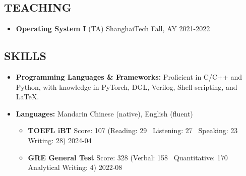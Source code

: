 \documentclass[a4paper,10pt]{ctexart} %
\begin{document}
\begin{keepsection}
\subsection{TEACHING}

    \begin{itemize}
        \item \textbf{Operating System I} (TA) \hfill ShanghaiTech \quad Fall, AY 2021-2022
    \end{itemize}
\end{keepsection}



\begin{keepsection}

\section{SKILLS}
\begin{itemize}
    \item \textbf{Programming Languages \& Frameworks:} Proficient in C/C++ and Python, with knowledge in PyTorch, DGL, Verilog, Shell scripting, and \LaTeX.
    \item \textbf{Languages:} Mandarin Chinese (native), English (fluent)
        \begin{itemize}
            \item \textbf{TOEFL iBT} \quad Score: 107 {\small (Reading: 29 \, Listening: 27 \, Speaking: 23 \, Writing: 28)} \hfill 2024-04
            \item \textbf{GRE General Test} \quad Score: 328 {\small (Verbal: 158 \, Quantitative: 170 \, Analytical Writing: 4)} \hfill 2022-08
        \end{itemize}
\end{itemize}

\end{keepsection}


\end{document}
